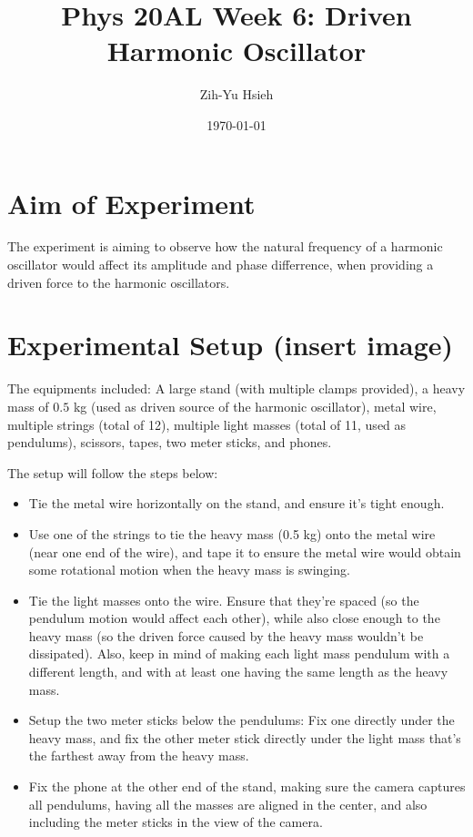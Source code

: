 \documentclass{article}
\title{Phys 20AL Week 6: Driven Harmonic Oscillator}
\author{Zih-Yu Hsieh}
\date{\today}
\begin{document}
\maketitle

\section{Aim of Experiment}
The experiment is aiming to observe how the natural frequency of a harmonic oscillator would affect its amplitude and phase differrence, when providing a driven force to the harmonic oscillators.

\hfil

\section{Experimental Setup (insert image)}
The equipments included: A large stand (with multiple clamps provided), a heavy mass of $0.5$ kg (used as driven source of the harmonic oscillator), metal wire, multiple strings (total of 12), multiple light masses (total of 11, used as pendulums), scissors, tapes, two meter sticks, and phones.

The setup will follow the steps below:
\begin{itemize}
    \item[1.] Tie the metal wire horizontally on the stand, and ensure it's tight enough.
    \item[2.] Use one of the strings to tie the heavy mass (0.5 kg) onto the metal wire (near one end of the wire), and tape it to ensure the metal wire would obtain some rotational motion when the heavy mass is swinging.
    \item[3.] Tie the light masses onto the wire. Ensure that they're spaced (so the pendulum motion would affect each other), while also close enough to the heavy mass (so the driven force caused by the heavy mass wouldn't be dissipated). Also, keep in mind of making each light mass pendulum with a different length, and with at least one having the same length as the heavy mass.
    \item[4.] Setup the two meter sticks below the pendulums: Fix one directly under the heavy mass, and fix the other meter stick directly under the light mass that's the farthest away from the heavy mass.
    \item[6.] Fix the phone at the other end of the stand, making sure the camera captures all pendulums, having all the masses are aligned in the center, and also including the meter sticks in the view of the camera. 
\end{itemize}
\end{document}
